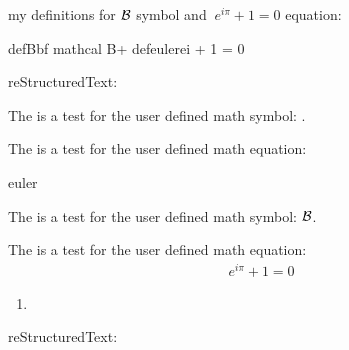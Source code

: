 \documentclass[letterpaper,12pt,english]{sphinxmanual}
\def\B{{\bf \mathcal B}}
\def\euler{\ e^{i\pi} + 1 = 0}
\begin{document}
my definitions for \(\B\) symbol and \(\euler\) equation:

\begin{sphinxVerbatim}[commandchars=\\\{\}]
\PYGZsq{}defBbf mathcal B\PYGZsq{}+ 
\PYGZsq{}defeulerei + 1 = 0\PYGZsq{}
\end{sphinxVerbatim}

reStructuredText:

\begin{sphinxVerbatim}[commandchars=\\\{\}]
The is a test for the user defined math symbol: .

The is a test for the user defined math equation:

 

        \PYGZbs{}euler
\end{sphinxVerbatim}

The is a test for the user defined math symbol: \(\B\).

The is a test for the user defined math equation:
\begin{equation*}
\begin{split}\euler\end{split}
\end{equation*}\begin{enumerate}
\def\theenumi{\arabic{enumi}}
\def\labelenumi{\theenumi .}
\makeatletter\def\p@enumii{\p@enumi \theenumi .}\makeatother
\setcounter{enumi}{3}
\item {} 

\end{enumerate}

reStructuredText:
\end{document}
